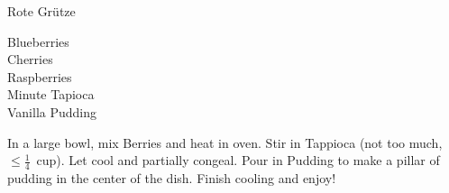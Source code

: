 
\begin{recipe}{Rote Gr\"utze}
  \maketitle

  \begin{ingredients2}[3]
    Blueberries\\
    Cherries\\
    Raspberries\\
    Minute Tapioca\\
    Vanilla Pudding
  \end{ingredients2}

  In a large bowl, mix Berries and heat in oven. Stir in Tappioca (not too
  much, $\leq\frac14$~cup). Let cool and partially congeal. Pour in Pudding
  to make a pillar of pudding in the center of the dish. Finish cooling and
  enjoy!
\end{recipe}


